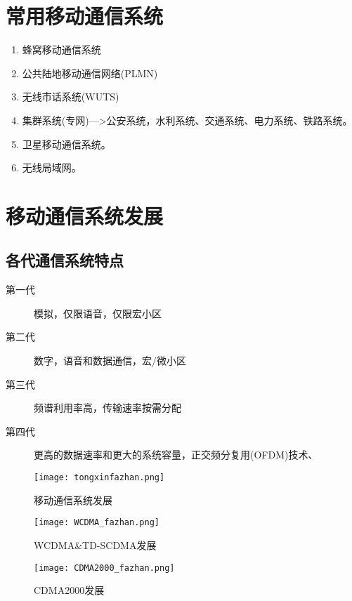 	\section{常用移动通信系统}
	\begin{enumerate}
		\item 蜂窝移动通信系统
		\item  公共陆地移动通信网络(PLMN)
		\item 无线市话系统(WUTS)
		\item 集群系统(专网)--->公安系统，水利系统、交通系统、电力系统、铁路系统。
		\item 卫星移动通信系统。
		\item 无线局域网。
	\end{enumerate}
	\section{移动通信系统发展}
	\subsection{各代通信系统特点}
	\begin{description}
		\item[第一代] 模拟，仅限语音，仅限宏小区
		\item[第二代]  数字，语音和数据通信，宏/微小区
		\item[第三代] 频谱利用率高，传输速率按需分配
		\item[第四代] 更高的数据速率和更大的系统容量，正交频分复用(OFDM)技术、
	\end{description}
	\begin{figure}[H]
		\centering
		\texttt{[image: tongxinfazhan.png]}
		\caption{移动通信系统发展}
	\end{figure}
	\begin{figure}[H]
		\centering
		\texttt{[image: WCDMA\_fazhan.png]}
		\caption{WCDMA\&TD-SCDMA发展}
	\end{figure}
	\begin{figure}[H]
		\centering
		\texttt{[image: CDMA2000\_fazhan.png]}
		\caption{CDMA2000发展}
	\end{figure}
	
